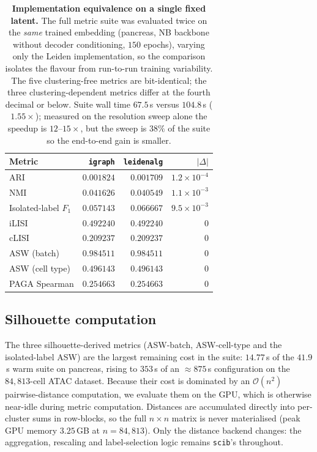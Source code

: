 \documentclass[11pt, a4paper]{article}
\begin{document}
\begin{table}[H]
\centering
\begin{tabular}{lrrr}
\hline
Metric & \texttt{igraph} & \texttt{leidenalg} & $|\Delta|$ \\
\hline
ARI                  & $0.001824$ & $0.001709$ & $1.2 \times 10^{-4}$ \\
NMI                  & $0.041626$ & $0.040549$ & $1.1 \times 10^{-3}$ \\
Isolated-label $F_1$ & $0.057143$ & $0.066667$ & $9.5 \times 10^{-3}$ \\
iLISI                & $0.492240$ & $0.492240$ & $0$ \\
cLISI                & $0.209237$ & $0.209237$ & $0$ \\
ASW (batch)          & $0.984511$ & $0.984511$ & $0$ \\
ASW (cell type)      & $0.496143$ & $0.496143$ & $0$ \\
PAGA Spearman        & $0.254663$ & $0.254663$ & $0$ \\
\hline
\end{tabular}
\caption{\textbf{Implementation equivalence on a single fixed latent.} The full metric
suite was evaluated twice on the \emph{same} trained embedding (pancreas, NB backbone
without decoder conditioning, $150$ epochs), varying only the Leiden implementation, so
the comparison isolates the flavour from run-to-run training variability. The five
clustering-free metrics are bit-identical; the three clustering-dependent metrics differ
at the fourth decimal or below. Suite wall time $67.5$\,s versus $104.8$\,s
($1.55\times$); measured on the resolution sweep alone the speedup is $12$--$15\times$,
but the sweep is $38\%$ of the suite so the end-to-end gain is smaller.}
\label{tab:leiden_equiv}
\end{table}

\subsection*{Silhouette computation}

The three silhouette-derived metrics (ASW-batch, ASW-cell-type and the isolated-label
ASW) are the largest remaining cost in the suite: $14.77$\,s of the $41.9$\,s warm suite
on pancreas, rising to $353$\,s of an $\approx\!875$\,s configuration on the
$84{,}813$-cell ATAC dataset. Because their cost is dominated by an
$\mathcal{O}(n^2)$ pairwise-distance computation, we evaluate them on the GPU, which is
otherwise near-idle during metric computation. Distances are accumulated directly into
per-cluster sums in row-blocks, so the full $n \times n$ matrix is never materialised
(peak GPU memory $3.25$\,GB at $n = 84{,}813$). Only the distance backend changes: the
aggregation, rescaling and label-selection logic remains \texttt{scib}'s throughout.
\end{document}

